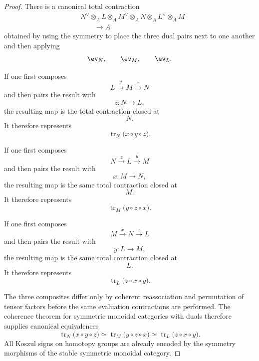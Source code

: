 \begin{proof}
There is a canonical total contraction
\[
\begin{aligned}
    &
    N^\vee
    \otimes_A
    L
    \otimes_A
    M^\vee
    \otimes_A
    N
    \otimes_A
    L^\vee
    \otimes_A
    M
    \\
    &\qquad\longrightarrow
    A
\end{aligned}
\]
obtained by using the symmetry to place the three dual pairs next to one
another and then applying
\[
    \ev_N,
    \qquad
    \ev_M,
    \qquad
    \ev_L.
\]

If one first composes
\[
    L
    \xrightarrow{y}
    M
    \xrightarrow{x}
    N
\]
and then pairs the result with
\[
    z
    \colon
    N
    \longrightarrow
    L,
\]
the resulting map is the total contraction closed at
\[
    N.
\]
It therefore represents
\[
    \operatorname{tr}_N
    \bigl(
        x\circ y\circ z
    \bigr).
\]

If one first composes
\[
    N
    \xrightarrow{z}
    L
    \xrightarrow{y}
    M
\]
and then pairs the result with
\[
    x
    \colon
    M
    \longrightarrow
    N,
\]
the resulting map is the same total contraction closed at
\[
    M.
\]
It therefore represents
\[
    \operatorname{tr}_M
    \bigl(
        y\circ z\circ x
    \bigr).
\]

If one first composes
\[
    M
    \xrightarrow{x}
    N
    \xrightarrow{z}
    L
\]
and then pairs the result with
\[
    y
    \colon
    L
    \longrightarrow
    M,
\]
the resulting map is the same total contraction closed at
\[
    L.
\]
It therefore represents
\[
    \operatorname{tr}_L
    \bigl(
        z\circ x\circ y
    \bigr).
\]

The three composites differ only by coherent reassociation and
permutation of tensor factors before the same evaluation contractions are
performed. The coherence theorem for symmetric monoidal categories with
duals therefore supplies canonical equivalences
\[
    \operatorname{tr}_N
    \bigl(
        x\circ y\circ z
    \bigr)
    \simeq
    \operatorname{tr}_M
    \bigl(
        y\circ z\circ x
    \bigr)
    \simeq
    \operatorname{tr}_L
    \bigl(
        z\circ x\circ y
    \bigr).
\]
All Koszul signs on homotopy groups are already encoded by the symmetry
morphisms of the stable symmetric monoidal category.


\end{proof}

